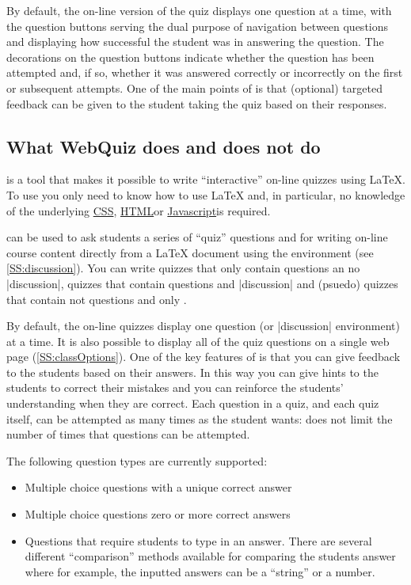 \documentclass[svgnames]{article}
\newcommand{\HTML}{\href{https://www.w3schools.com/html/html_intro.asp}{HTML}}
\newcommand\CSS{\href{https://www.w3schools.com/css}{CSS}}
\newcommand\Javascript{\href{https://www.w3schools.com/Js/}{Javascript}}
\begin{document}
      By default, the on-line version of the quiz displays one question at
      a time, with the question buttons serving the dual purpose of
      navigation between questions and displaying how successful the
      student was in answering the question. The decorations on the
      question buttons indicate whether the question has been attempted
      and, if so, whether it was answered correctly or incorrectly on the
      first or subsequent attempts. One of the main points of \WebQuiz is
      that (optional) targeted feedback can be given to the student taking
      the quiz based on their responses.

  \subsection{What WebQuiz does and does not do}

      \WebQuiz is a tool that makes it possible to write ``interactive''
      on-line quizzes using \LaTeX{}. To use \WebQuiz you only need to
      know how to use \LaTeX{} and, in particular, no knowledge of the
      underlying \CSS, \HTML or \Javascript is required.

      \WebQuiz can be used to ask students a series of ``quiz'' questions
      and for writing on-line course content directly from a \LaTeX{}
      document using the \WebQuiz {} environment (see
      \autoref{SS:discussion}). You can write \WebQuiz quizzes that only
      contain questions an no \LatexCode|discussion|, quizzes that contain
      questions and \LatexCode|discussion| and (psuedo) quizzes that
      contain not questions and only .

      By default, the on-line quizzes display one question (or
      \LatexCode|discussion| environment) at a time.  It is also possible
      to display all of the quiz questions on a single web page
      (\autoref{SS:classOptions}). One of the key features of \WebQuiz is
      that you can give feedback to the students based on their answers.
      In this way you can give hints to the students to correct their
      mistakes and you can reinforce the students' understanding when they
      are correct. Each question in a quiz, and each quiz itself, can be
      attempted as many times as the student wants: \WebQuiz does not
      limit the number of times that questions can be attempted.

      The following question types are currently supported:
      \begin{itemize}
        \item Multiple choice questions with a unique correct answer
        \item Multiple choice questions zero or more correct answers
        \item Questions that require students to type in an answer. There
        are several different ``comparison'' methods available for
        comparing the students answer where
        for example, the inputted answers can be a ``string'' or a number.
      \end{itemize}
\end{document}
